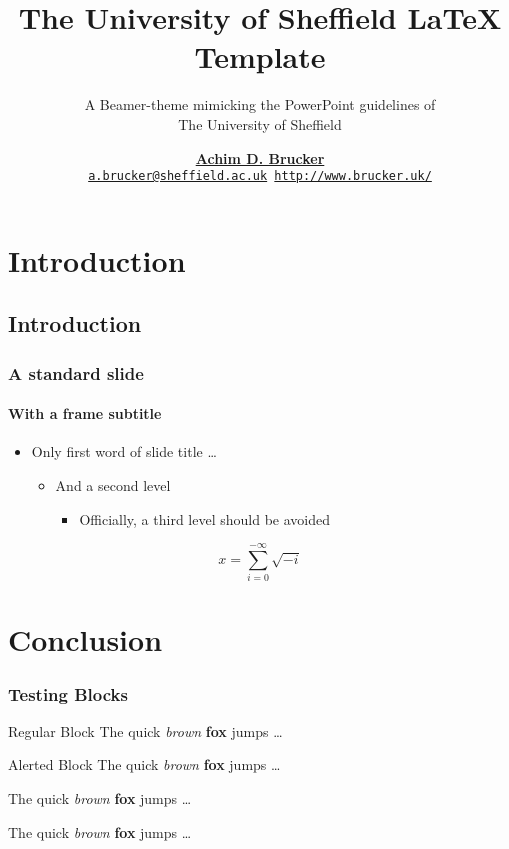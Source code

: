 \documentclass[aspectratio=169,colour]{tuos-presentation}
\title{The University of Sheffield \LaTeX{} Template}
\subtitle{A Beamer-theme mimicking the PowerPoint guidelines of \\The
  University of Sheffield}
\institute[The University of Sheffield]
{Department of Computer Science, The University of Sheffield, Sheffield, UK}
\author[A.D. Brucker] {%
    \href{http://www.brucker.uk/}{\textbf{Achim D. Brucker}}\\
    \texttt{\footnotesize\href{mailto:"Achim D. Brucker"
        <a.brucker@sheffield.ac.uk>}{a.brucker@sheffield.ac.uk}
      \hspace{.6cm}
      \url{http://www.brucker.uk/}}
    }
\begin{document}
\begin{frame}
  \maketitle
\end{frame}

\AgendaFrame

\section{Introduction}
\subsection{Introduction}
\begin{frame}
  \frametitle{A standard slide}
  \framesubtitle{With a frame subtitle}
  \begin{itemize}
  \item Only first word of slide title \ldots
    \begin{itemize}
    \item  And a second level 
      \begin{itemize}
      \item  Officially, a third level should be avoided
      \end{itemize}
    \end{itemize}
  \end{itemize}
  \[ x = \sum_{i=0}^{-\infty}\sqrt{-i}\]
\end{frame}

\section{Conclusion}

\begin{frame}
  \frametitle{Testing Blocks}
  \begin{block}{Regular Block}
    The \alert{quick} \emph{brown} \textbf{fox} jumps \ldots  
  \end{block}

  \begin{alertblock}{Alerted Block}
    The \alert{quick} \emph{brown} \textbf{fox} jumps \ldots  
  \end{alertblock}

  \begin{Example}
    The \alert{quick} \emph{brown} \textbf{fox} jumps \ldots  
  \end{Example}

  \begin{quotebox}
    The \alert{quick} \emph{brown} \textbf{fox} jumps \ldots  
  \end{quotebox}
\end{frame}
\end{document}
